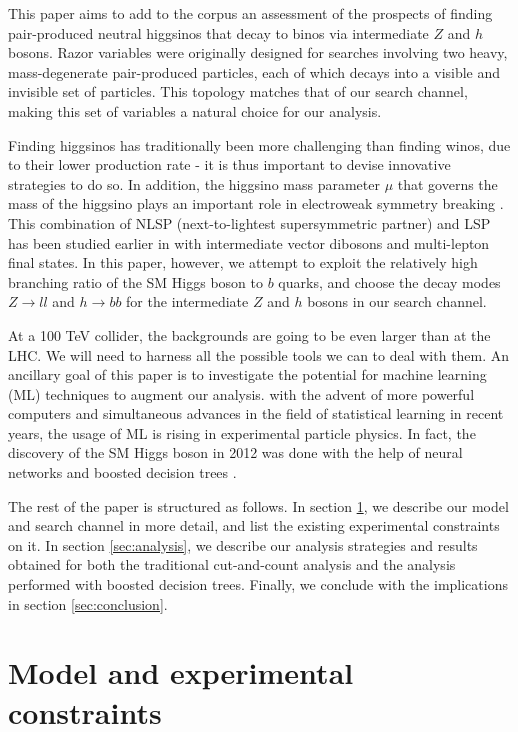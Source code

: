 This paper aims to add to the corpus an assessment of the prospects of finding pair-produced neutral higgsinos that decay to binos via intermediate $Z$ and $h$ bosons. Razor variables \citep{Rogan2010} were originally designed for searches involving two heavy, mass-degenerate pair-produced particles, each of which decays into a visible and invisible set of particles. This topology matches that of our search channel, making this set of variables a natural choice for our analysis.

Finding higgsinos has traditionally been more challenging than finding winos, due to their lower production rate - it is thus important to devise innovative strategies to do so. In addition, the higgsino mass parameter $\mu$ that governs the mass of the higgsino plays an important role in electroweak symmetry breaking \citep{Acharya2014}. This combination of NLSP (next-to-lightest supersymmetric partner) and LSP has been studied earlier in \citep{Gori:2014oua} with intermediate vector dibosons and multi-lepton final states. In this paper, however, we attempt to exploit the relatively high branching ratio of the SM Higgs boson to $b$ quarks, and choose the decay modes $Z\rightarrow ll$ and $h\rightarrow bb$ for the intermediate $Z$ and $h$ bosons in our search channel.  

At a 100 TeV collider, the backgrounds are going to be even larger than at the LHC. We will need to harness all the possible tools we can to deal with them. An ancillary goal of this paper is to investigate the potential for machine learning (ML) techniques to augment our analysis. with the advent of more powerful computers and simultaneous advances in the field of statistical learning in recent years, the usage of ML is rising in experimental particle physics. In fact, the discovery of the SM Higgs boson in 2012 was done with the help of neural networks \citep{ATLASCollaboration2012} and boosted decision trees \citep{CMSCollaboration2012}.

The rest of the paper is structured as follows. In section \ref{sec:model}, we describe our model and search channel in more detail, and list the existing experimental constraints on it. In section \ref{sec:analysis}, we describe our analysis strategies and results obtained for both the traditional cut-and-count analysis and the analysis performed with boosted decision trees. Finally, we conclude with the implications in section \ref{sec:conclusion}.

\section{Model and experimental constraints}\label{sec:model}

